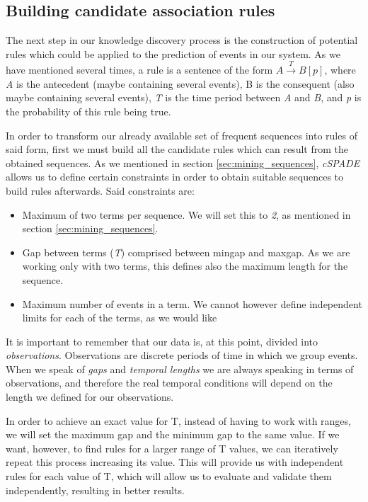\documentclass[a4paper,12pt]{article}
\begin{document}
\subsection{Building candidate association rules} 
\label{sec:assoc_rules}
The next step in our knowledge discovery process is the construction of potential rules which could be applied to the prediction of events in our system. As we have mentioned several times, a rule is a sentence of the form ${A} \xrightarrow{T} {B} [p]$, where \emph{A} is the antecedent (maybe containing several events), B is the consequent (also maybe containing several events), \emph{T} is the time period between \emph{A} and \emph{B}, and \emph{p} is the probability of this rule being true.

In order to transform our already available set of frequent sequences into rules of said form, first we must build all the candidate rules which can result from the obtained sequences. As we mentioned in section \ref{sec:mining_sequences}, \emph{cSPADE} allows us to define certain constraints in order to obtain suitable sequences to build rules afterwards. Said constraints are:

\begin{itemize}
\item Maximum of two terms per sequence. We will set this to \emph{2}, as mentioned in section \ref{sec:mining_sequences}.
\item Gap between terms (\emph{T}) comprised between mingap and maxgap. As we are working only with two terms, this defines also the maximum length for the sequence.
\item Maximum number of events in a term. We cannot however define independent limits for each of the terms, as we would like
\end{itemize}

It is important to remember that our data is, at this point, divided into \emph{observations}. Observations are discrete periods of time in which we group events. When we speak of \emph{gaps} and \emph{temporal lengths} we are always speaking in terms of observations, and therefore the real temporal conditions will depend on the length we defined for our observations.

In order to achieve an exact value for T, instead of having to work with ranges, we will set the maximum gap and the minimum gap to the same value. If we want, however, to find rules for a larger range of T values, we can iteratively repeat this process increasing its value. This will provide us with independent rules for each value of T, which will allow us to evaluate and validate them independently, resulting in better results. 
\end{document}
